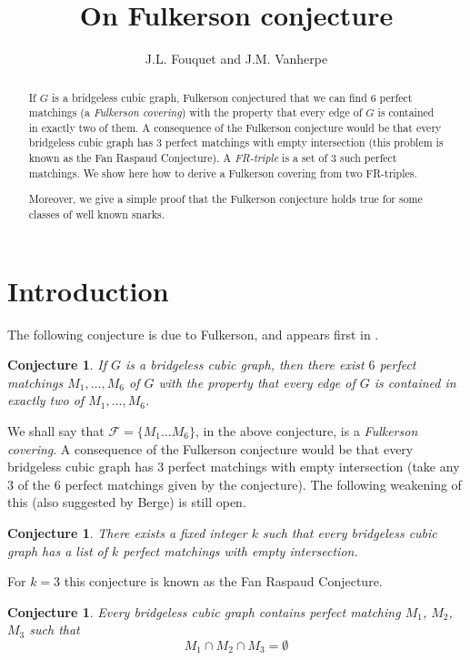 \documentclass{amsart}
\title[]{On Fulkerson conjecture}
\author{J.L. Fouquet and J.M. Vanherpe}
\newtheorem{conj}[thm]{Conjecture}
\theoremstyle{definition}
\theoremstyle{remark}
\begin{document}

\begin{abstract}
If $G$ is a bridgeless cubic graph, Fulkerson conjectured that we
can find  $6$ perfect matchings (a {\em Fulkerson covering})  with
the property that every edge of $G$ is contained in exactly two of
them. A consequence of the Fulkerson conjecture would be that every
bridgeless cubic graph has $3$ perfect matchings with empty
intersection (this problem is known as the Fan Raspaud Conjecture).
A {\em FR-triple} is a set of $3$ such perfect matchings. We show
here how to derive a Fulkerson covering from two FR-triples.

Moreover, we give a simple proof that the Fulkerson conjecture holds
true for some classes of well known snarks.
\end{abstract}

\maketitle

\section{Introduction}
The following conjecture is due to Fulkerson, and appears first in
\cite{Ful71}.
\begin{conj}\label{Conjecture:Fulkerson} If $G$ is a bridgeless
cubic graph, then there exist $6$ perfect matchings $M_1,\ldots,M_6$
of $G$ with the property that every edge of $G$ is contained in
exactly two of $M_1,\ldots,M_6$.
\end{conj}

We shall say that  $\mathcal F=\{M_{1} \ldots M_{6}\}$, in the above
conjecture, is a {\em Fulkerson covering}. A consequence of the
Fulkerson conjecture would be that every bridgeless cubic graph has
$3$ perfect matchings with empty intersection (take any $3$ of the
$6$ perfect matchings given by the conjecture). The following
weakening of this (also suggested by Berge) is still open.

\begin{conj}\label{Conjecture:Berge2}There exists a fixed integer $ k $
such that every bridgeless cubic graph has a list of $ k $ perfect
matchings with empty intersection.
\end{conj}


For $k=3$ this conjecture is known as the Fan Raspaud Conjecture.

\begin{conj}\cite{FanRas} \label{Conjecture:FanRaspaud} Every
bridgeless cubic graph contains perfect matching $M_1$, $M_2$, $M_3$
such that
$$M_1 \cap M_2 \cap M_3 = \emptyset$$
\end{conj}
\end{document}
